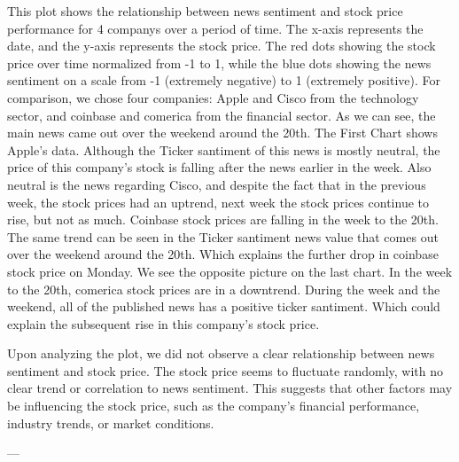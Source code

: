 This plot shows the relationship between news sentiment and stock price performance for 4 companys over a period of time. The x-axis represents the date, and the y-axis represents the stock price. The red dots showing the stock price over time normalized from -1 to 1, while the blue dots showing the news sentiment on a scale from -1 (extremely negative) to 1 (extremely positive). For comparison, we chose four companies: Apple and Cisco from the technology sector, and coinbase and comerica from the financial sector. As we can see, the main news came out over the weekend around the 20th. The First Chart shows Apple's data.  Although the Ticker santiment of this news is mostly neutral, the price of this company's stock is falling after the news earlier in the week.  Also neutral is the news regarding Cisco, and despite the fact that in the previous week, the stock prices had an uptrend, next week the stock prices continue to rise, but not as much.  Coinbase stock prices are falling in the week to the 20th.  The same trend can be seen in the Ticker santiment news value that comes out over the weekend around the 20th.  Which explains the further drop in coinbase stock price on Monday.   We see the opposite picture on the last chart.   In the week to the 20th, comerica stock prices are in a downtrend.  During the week and the weekend, all of the published news has a positive ticker santiment.  Which could explain the subsequent rise in this company's stock price.


Upon analyzing the plot, we did not observe a clear relationship between news sentiment and stock price. The stock price seems to fluctuate randomly, with no clear trend or correlation to news sentiment. This suggests that other factors may be influencing the stock price, such as the company's financial performance, industry trends, or market conditions.

---

